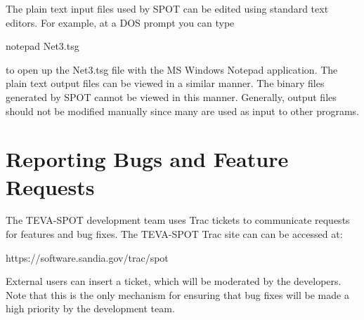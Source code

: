 The plain text input files used by SPOT can be edited using standard text editors. For example, at a DOS prompt you can type \begin{verb}
  notepad Net3.tsg
\end{verb}
 to open up the {\ttfamily Net3.tsg} file with the MS Windows Notepad application. The plain text output files can be viewed in a similar manner. The binary files generated by SPOT cannot be viewed in this manner. Generally, output files should not be modified manually since many are used as input to other programs.

\section{Reporting Bugs and Feature Requests}\label{example_gStarted6}
The TEVA-\/SPOT development team uses Trac tickets to communicate requests for features and bug fixes. The TEVA-\/SPOT Trac site can can be accessed at: \begin{verb}
  https://software.sandia.gov/trac/spot
\end{verb}
 External users can insert a ticket, which will be moderated by the developers. Note that this is the only mechanism for ensuring that bug fixes will be made a high priority by the development team. 
